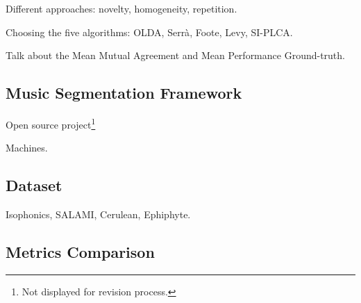 \documentclass{article}
\begin{document}
Different approaches: novelty, homogeneity, repetition.

Choosing the five algorithms: OLDA\cite{McFee2014}, Serr\`a\cite{Serra2013},
Foote\cite{Foote1999}, Levy\cite{Levy2008}, SI-PLCA\cite{Weiss2011}.

Talk about the Mean Mutual Agreement and Mean Performance Ground-truth\cite{Holzapfel2012}.

\subsection{Music Segmentation Framework}

Open source project\footnote{Not displayed for revision process.}

Machines.

\subsection{Dataset}

Isophonics, SALAMI\cite{Smith2011}, Cerulean, Ephiphyte.

\subsection{Metrics Comparison}
\end{document}
